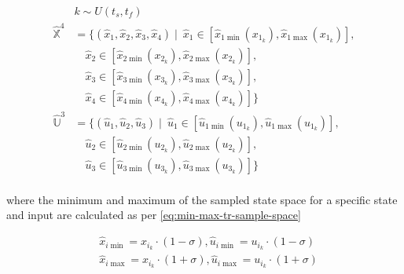 \begin{equation}\label{eq:TR-sample-space}
	\begin{split}
		& k \sim U(t_s,t_f)  \\
		\hat{\mathbb{X}}^4 &= \{ (\hat{x}_1, \hat{x}_2, \hat{x}_3, \hat{x}_4) \mid\ \hat{x}_1 \in [\hat{x}_{1\min}(x_{1_k}), \hat{x}_{1\max}(x_{1_k})], \\
		&\quad \hat{x}_2 \in [\hat{x}_{2\min}(x_{2_k}), \hat{x}_{2\max}(x_{2_k})], \\
		&\quad \hat{x}_3 \in [\hat{x}_{3\min}(x_{3_k}), \hat{x}_{3\max}(x_{3_k})], \\
		&\quad \hat{x}_4 \in [\hat{x}_{4\min}(x_{4_k}), \hat{x}_{4\max}(x_{4_k})] \} \\
		\hat{\mathbb{U}}^3 &= \{ (\hat{u}_1, \hat{u}_2, \hat{u}_3) \mid\ \hat{u}_1 \in [\hat{u}_{1\min}(u_{1_k}), \hat{u}_{1\max}(u_{1_k})], \\
		&\quad \hat{u}_2 \in [\hat{u}_{2\min}(u_{2_k}), \hat{u}_{2\max}(u_{2_k})], \\
		&\quad \hat{u}_3 \in [\hat{u}_{3\min}(u_{3_k}), \hat{u}_{3\max}(u_{3_k})] \} \\    
	\end{split}
\end{equation}

where the minimum and maximum of the sampled state space for a specific state and input are calculated as per \autoref{eq:min-max-tr-sample-space}

\begin{equation}\label{eq:min-max-tr-sample-space}
	\begin{aligned}
		&\hat{x}_{i\min} = x_{i_k} \cdot (1-\sigma),\hat{u}_{i\min} = u_{i_k} \cdot (1-\sigma)\\
		&\hat{x}_{i\max} = x_{i_k} \cdot (1+\sigma),\hat{u}_{i\max} = u_{i_k} \cdot (1+\sigma)
	\end{aligned}
\end{equation}


